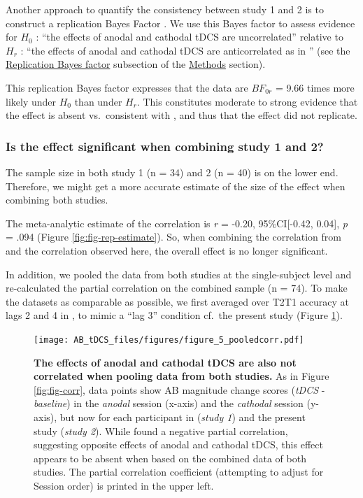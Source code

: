\documentclass[11pt,]{memoir}
\begin{document}
Another approach to quantify the consistency between study 1 and 2 is to construct a replication Bayes Factor \autocite{Wagenmakers2016}. We use this Bayes factor to assess evidence for \(H_0\) : ``the effects of anodal and cathodal tDCS are uncorrelated'' relative to \(H_r\) : ``the effects of anodal and cathodal tDCS are anticorrelated as in \textcite{London2015}'' (see the \protect\hyperlink{repBF}{Replication Bayes factor} subsection of the \protect\hyperlink{AB_tDCS-methods}{Methods} section).

This replication Bayes factor expresses that the data are \(BF_{0r}\) = 9.66 times more likely under \(H_0\) than under \(H_r\). This constitutes moderate to strong evidence that the effect is absent vs.~consistent with \textcite{London2015}, and thus that the effect did not replicate.

\hypertarget{is-the-effect-significant-when-combining-study-1-and-2}{%
\subsubsection{Is the effect significant when combining study 1 and 2?}\label{is-the-effect-significant-when-combining-study-1-and-2}}

The sample size in both study 1 (n = 34) and 2 (n = 40) is on the lower end. Therefore, we might get a more accurate estimate of the size of the effect when combining both studies.

The meta-analytic estimate of the correlation is \emph{r} = -0.20, 95\%CI{[}-0.42, 0.04{]}, \emph{p} = .094 (Figure \ref{fig:fig-rep-estimate}). So, when combining the correlation from \textcite{London2015} and the correlation observed here, the overall effect is no longer significant.

In addition, we pooled the data from both studies at the single-subject level and re-calculated the partial correlation on the combined sample (n = 74). To make the datasets as comparable as possible, we first averaged over T2\textbar{}T1 accuracy at lags 2 and 4 in \textcite{London2015}, to mimic a ``lag 3'' condition cf.~the present study (Figure \ref{fig:fig-corr-pooled}).

\begin{figure}
\centering
\texttt{[image: AB\_tDCS\_files/figures/figure\_5\_pooledcorr.pdf]}
\caption{\label{fig:fig-corr-pooled}\textbf{The effects of anodal and cathodal tDCS are also not correlated when pooling data from both studies.} As in Figure \ref{fig:fig-corr}, data points show AB magnitude change scores (\emph{tDCS} - \emph{baseline}) in the \emph{anodal} session (x-axis) and the \emph{cathodal} session (y-axis), but now for each participant in \textcite{London2015} (\emph{study 1}) and the present study (\emph{study 2}). While \textcite{London2015} found a negative partial correlation, suggesting opposite effects of anodal and cathodal tDCS, this effect appears to be absent when based on the combined data of both studies. The partial correlation coefficient (attempting to adjust for Session order) is printed in the upper left.}
\end{figure}
\end{document}

